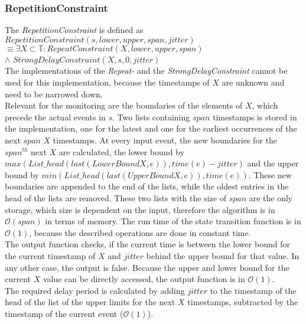 \subsubsection{RepetitionConstraint}
	The  \emph{RepetitionConstraint} is defined as\\[10pt]
		$RepetitionConstraint(s, lower, upper, span, jitter)$\\
		$\equiv \exists X\subset \mathbb{T}: RepeatConstraint (X, lower, upper, span)$\\
		\hspace{7cm}$\land$ $StrongDelayConstraint(X, s, 0, jitter)$\\[10pt]
	The implementations of the \emph{Repeat-} and the \emph{StrongDelayConstraint} cannot be used for this implementation, because the timestamps of $X$ are unknown and need to be narrowed down.\\
	Relevant for the monitoring are the boundaries of the elements of $X$, which precede the actual events in $s$. Two lists containing $span$ timestamps is stored in the implementation, one for the latest and one for the earliest occurrences of the next $span$ $X$ timestamps. At every input event, the new boundaries for the $span^{th}$ next $X$ are calculated, the lower bound by $max(List\_head(last(LowerBoundX, e)), time(e)-jitter)$ and the upper bound by $min(List\_head(last(UpperBoundX, e)), time(e))$. These new boundaries are appended to the end of the lists, while the oldest entries in the head of the lists are removed. These two lists with the size of $span$ are the only storage, which size is dependent on the input, therefore the algorithm is in $\mathcal{O}(span)$ in terms of memory. The run time of the state transition function is in $\mathcal{O}(1)$, because the described operations are done in constant time.\\
	The output function checks, if the current time is between the lower bound for the current timestamp of $X$ and $jitter$ behind the upper bound for that value. In any other case, the output is false. Because the upper and lower bound for the current $X$ value can be directly accessed, the output function is in $\mathcal{O}(1)$.\\
	The required delay period is calculated by adding $jitter$ to the timestamp of the head of the list of the upper limits for the next $X$ timestamps, subtracted by the timestamp of the current event ($\mathcal{O}(1)$).
	
